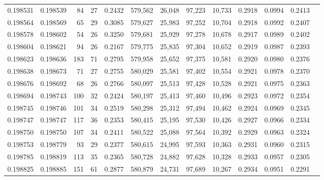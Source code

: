 \begin{tabular}{rrrrrrrrrrrrr}
0.198531 & 0.198539 &    84 &  27 &                                     0.2432 & 579,562 &  26,048 &  97,223 &  10,733 & 0.2918 & 0.0994 & 0.2413 \\
0.198564 & 0.198569 &    65 &  29 &                                     0.3085 & 579,627 &  25,983 &  97,252 &  10,704 & 0.2918 & 0.0992 & 0.2407 \\
0.198578 & 0.198602 &    54 &  26 &                                     0.3250 & 579,681 &  25,929 &  97,278 &  10,678 & 0.2917 & 0.0989 & 0.2402 \\
0.198604 & 0.198621 &    94 &  26 &                                     0.2167 & 579,775 &  25,835 &  97,304 &  10,652 & 0.2919 & 0.0987 & 0.2393 \\
0.198623 & 0.198636 &   183 &  71 &                                     0.2795 & 579,958 &  25,652 &  97,375 &  10,581 & 0.2920 & 0.0980 & 0.2376 \\
0.198638 & 0.198673 &    71 &  27 &                                     0.2755 & 580,029 &  25,581 &  97,402 &  10,554 & 0.2921 & 0.0978 & 0.2370 \\
0.198676 & 0.198692 &    68 &  26 &                                     0.2766 & 580,097 &  25,513 &  97,428 &  10,528 & 0.2921 & 0.0975 & 0.2363 \\
0.198694 & 0.198743 &   100 &  32 &                                     0.2424 & 580,197 &  25,413 &  97,460 &  10,496 & 0.2923 & 0.0972 & 0.2354 \\
0.198745 & 0.198746 &   101 &  34 &                                     0.2519 & 580,298 &  25,312 &  97,494 &  10,462 & 0.2924 & 0.0969 & 0.2345 \\
0.198747 & 0.198747 &   117 &  36 &                                     0.2353 & 580,415 &  25,195 &  97,530 &  10,426 & 0.2927 & 0.0966 & 0.2334 \\
0.198750 & 0.198750 &   107 &  34 &                                     0.2411 & 580,522 &  25,088 &  97,564 &  10,392 & 0.2929 & 0.0963 & 0.2324 \\
0.198753 & 0.198779 &    93 &  29 &                                     0.2377 & 580,615 &  24,995 &  97,593 &  10,363 & 0.2931 & 0.0960 & 0.2315 \\
0.198785 & 0.198819 &   113 &  35 &                                     0.2365 & 580,728 &  24,882 &  97,628 &  10,328 & 0.2933 & 0.0957 & 0.2305 \\
0.198825 & 0.198885 &   151 &  61 &                                     0.2877 & 580,879 &  24,731 &  97,689 &  10,267 & 0.2934 & 0.0951 & 0.2291 \\

\end{tabular}
